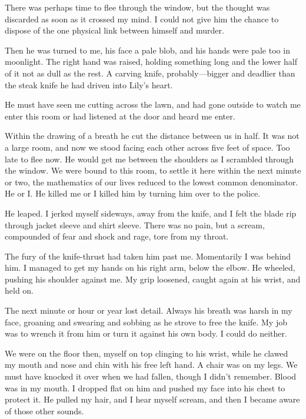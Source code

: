 \documentclass{novel}
\begin{document}
\scenestars

There was perhaps time to flee through the window, but the thought was discarded as soon as it crossed my mind. I could not give him the chance to dispose of the one physical link between himself and murder.

Then he was turned to me, his face a pale blob, and his hands were pale too in moonlight. The right hand was raised, holding something long and the lower half of it not as dull as the rest. A carving knife, probably—bigger and deadlier than the steak knife he had driven into Lily’s heart.

He must have seen me cutting across the lawn, and had gone outside to watch me enter this room or had listened at the door and heard me enter.

Within the drawing of a breath he cut the distance between us in half. It was not a large room, and now we stood facing each other across five feet of space. Too late to flee now. He would get me between the shoulders as I scrambled through the window. We were bound to this room, to settle it here within the next minute or two, the mathematics of our lives reduced to the lowest common denominator. He or I. He killed me or I killed him by turning him over to the police.

He leaped. I jerked myself sideways, away from the knife, and I felt the blade rip through jacket sleeve and shirt sleeve. There was no pain, but a scream, compounded of fear and shock and rage, tore from my throat.

The fury of the knife-thrust had taken him past me. Momentarily I was behind him. I managed to get my hands on his right arm, below the elbow. He wheeled, pushing his shoulder against me. My grip loosened, caught again at his wrist, and held on.

The next minute or hour or year lost detail. Always his breath was harsh in my face, groaning and swearing and sobbing as he strove to free the knife. My job was to wrench it from him or turn it against his own body. I could do neither.

We were on the floor then, myself on top clinging to his wrist, while he clawed my mouth and nose and chin with his free left hand. A chair was on my legs. We must have knocked it over when we had fallen, though I didn’t remember. Blood was in my mouth. I dropped flat on him and pushed my face into his chest to protect it. He pulled my hair, and I hear myself scream, and then I became aware of those other sounds.
\end{document}
